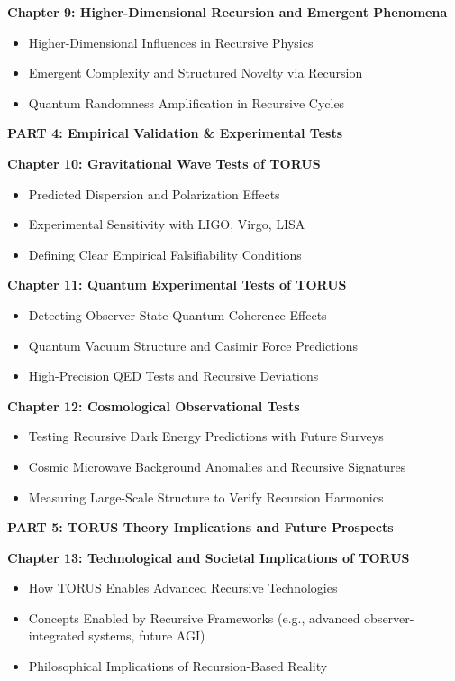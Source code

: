 \documentclass[]{article}
\begin{document}
\textbf{Chapter 9: Higher-Dimensional Recursion and Emergent Phenomena}

\begin{itemize}
\item
  Higher-Dimensional Influences in Recursive Physics
\item
  Emergent Complexity and Structured Novelty via Recursion
\item
  Quantum Randomness Amplification in Recursive Cycles
\end{itemize}

\textbf{PART 4: Empirical Validation \& Experimental Tests}

\textbf{Chapter 10: Gravitational Wave Tests of TORUS}

\begin{itemize}
\item
  Predicted Dispersion and Polarization Effects
\item
  Experimental Sensitivity with LIGO, Virgo, LISA
\item
  Defining Clear Empirical Falsifiability Conditions
\end{itemize}

\textbf{Chapter 11: Quantum Experimental Tests of TORUS}

\begin{itemize}
\item
  Detecting Observer-State Quantum Coherence Effects
\item
  Quantum Vacuum Structure and Casimir Force Predictions
\item
  High-Precision QED Tests and Recursive Deviations
\end{itemize}

\textbf{Chapter 12: Cosmological Observational Tests}

\begin{itemize}
\item
  Testing Recursive Dark Energy Predictions with Future Surveys
\item
  Cosmic Microwave Background Anomalies and Recursive Signatures
\item
  Measuring Large-Scale Structure to Verify Recursion Harmonics
\end{itemize}

\textbf{PART 5: TORUS Theory Implications and Future Prospects}

\textbf{Chapter 13: Technological and Societal Implications of TORUS}

\begin{itemize}
\item
  How TORUS Enables Advanced Recursive Technologies
\item
  Concepts Enabled by Recursive Frameworks (e.g., advanced
  observer-integrated systems, future AGI)
\item
  Philosophical Implications of Recursion-Based Reality
\end{itemize}
\end{document}
